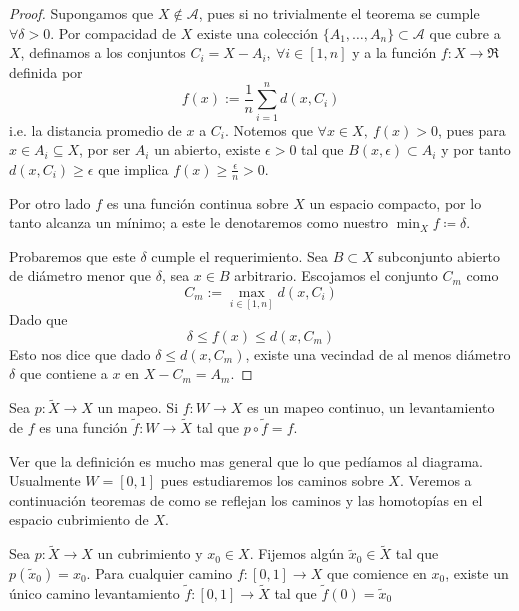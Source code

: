 \begin{proof}
  Supongamos que \(X \not \in \mathcal A\), pues si no trivialmente el
  teorema se cumple \(\forall \delta > 0\). Por compacidad de \(X\)
  existe una colección \(\{A_1,\dotsc,A_n\} \subset \mathcal A\) que
  cubre a \(X\), definamos a los conjuntos \(C_i = X - A_i,\ \forall i
  \in [1,n]\) y a la función \(f : X \to \Re\) definida por
  \[ f(x) := \frac 1 n \sum_{i=1}^{n} d(x, C_i) \]
  i.e. la distancia promedio de \(x\) a \(C_i\). Notemos que \(\forall x
  \in X,\ f(x) > 0\), pues para \(x \in A_i \subseteq X\), por ser
  \(A_i\) un abierto, existe \(\epsilon > 0\) tal que \(B(x,\epsilon)
  \subset A_i\) y por tanto \(d(x, C_i) \geq \epsilon\) que implica \(
  f(x) \geq \frac \epsilon n > 0\).

  Por otro lado \(f\) es una función continua sobre \(X\) un espacio
  compacto, por lo tanto alcanza un mínimo; a este le denotaremos como
  nuestro \(\min_X f \coloneqq \delta \).

  Probaremos que este \(\delta\) cumple el requerimiento. Sea \(B
  \subset X\) subconjunto abierto de diámetro menor que \(\delta\), sea
  \(x \in B\) arbitrario. Escojamos el conjunto \(C_m\) como
  \[ C_m := \max_{i \in [1,n]} d(x, C_i) \]
  Dado que
  \[\delta \leq f(x) \leq d(x, C_m) \]
  Esto nos dice que dado \(\delta \leq d(x, C_m)\), existe una vecindad
  de al menos diámetro \(\delta\) que contiene a \(x\) en \(X - C_m = A_m\).
\end{proof}
\begin{definicion}[Levantamiento de \(f\)]
  Sea \(p : \tilde X \to X\) un mapeo. Si \(f : W \to X\) es un mapeo
  continuo, un levantamiento de \(f\) es una función \(\tilde f : W \to
  \tilde X\) tal que \(p \circ \tilde f = f\).
\end{definicion}
Ver que la definición es mucho mas general que lo que pedíamos al
diagrama. Usualmente \(W = [0,1]\) pues estudiaremos los caminos sobre
\(X\). Veremos a continuación teoremas de como se reflejan los caminos
y las homotopías en el espacio cubrimiento de \(X\).
\begin{teorema} \label{thm:lifting-theorem}
  Sea \(p : \tilde X \to X\) un cubrimiento y \(x_0 \in X\). Fijemos
  algún \(\tilde x _0 \in \tilde X\) tal que \(p(\tilde x _0) = x_0 \).
  Para cualquier camino \(f : [0,1] \to X\) que comience en \(x_0\), existe
  un único camino levantamiento \(\tilde f : [0,1] \to \tilde X\) tal que
  \(\tilde f (0) = \tilde x _0\)
\end{teorema}
